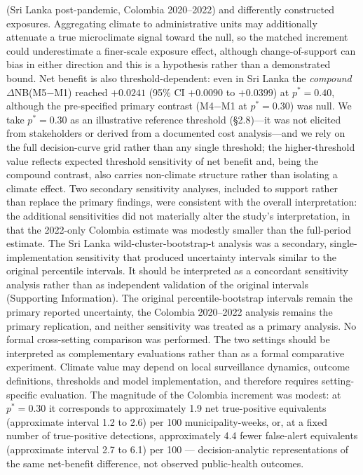 \documentclass[11pt,a4paper]{article}
\begin{document}
(Sri Lanka post-pandemic, Colombia 2020--2022) and differently constructed exposures. Aggregating climate to administrative units may additionally attenuate a true microclimate signal toward the null, so the matched increment could underestimate a finer-scale exposure effect, although change-of-support can bias in either direction and this is a hypothesis rather than a demonstrated bound. Net benefit is also threshold-dependent: even in Sri Lanka the \emph{compound} $\Delta$NB(M5$-$M1) reached $+0.0241$ (95\% CI $+0.0090$ to $+0.0399$) at $p^*=0.40$, although the pre-specified primary contrast (M4$-$M1 at $p^*=0.30$) was null. We take $p^*=0.30$ as an illustrative reference threshold (\S2.8)---it was not elicited from stakeholders or derived from a documented cost analysis---and we rely on the full decision-curve grid rather than any single threshold; the higher-threshold value reflects expected threshold sensitivity of net benefit and, being the compound contrast, also carries non-climate structure rather than isolating a climate effect. Two secondary sensitivity analyses, included to support rather than replace the primary findings, were consistent with the overall interpretation: the additional sensitivities did not materially alter the study's interpretation, in that the 2022-only Colombia estimate was modestly smaller than the full-period estimate. The Sri Lanka wild-cluster-bootstrap-t analysis was a secondary, single-implementation sensitivity that produced uncertainty intervals similar to the original percentile intervals. It should be interpreted as a concordant sensitivity analysis rather than as independent validation of the original intervals (Supporting Information). The original percentile-bootstrap intervals remain the primary reported uncertainty, the Colombia 2020--2022 analysis remains the primary replication, and neither sensitivity was treated as a primary analysis. No formal cross-setting comparison was performed. The two settings should be interpreted as complementary evaluations rather than as a formal comparative experiment. Climate value may depend on local surveillance dynamics, outcome definitions, thresholds and model implementation, and therefore requires setting-specific evaluation. The magnitude of the Colombia increment was modest: at $p^*=0.30$ it corresponds to approximately 1.9 net true-positive equivalents (approximate interval 1.2 to 2.6) per 100 municipality-weeks, or, at a fixed number of true-positive detections, approximately 4.4 fewer false-alert equivalents (approximate interval 2.7 to 6.1) per 100 --- decision-analytic representations of the same net-benefit difference, not observed public-health outcomes.
\end{document}
